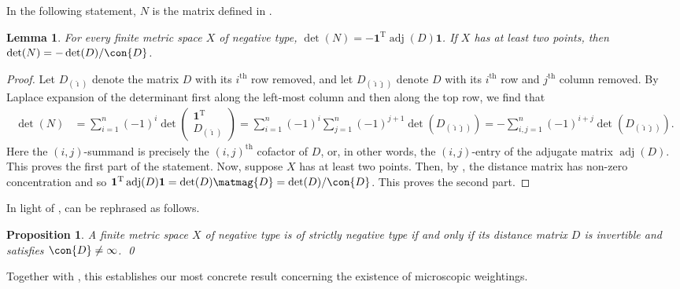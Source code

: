 \documentclass[a4paper, oneside, reqno]{amsart}
\newtheorem{lemma}[theorem]{Lemma}
\newtheorem{prop}[theorem]{Proposition}
\theoremstyle{definition}
\theoremstyle{remark}
\numberwithin{equation}{section}
\DeclareMathOperator{\adj}{adj}
\renewcommand{\th}{\text{th}}
\newcommand{\onevector}{\mathbf{1}}
\newcommand{\transpose}{\mathrm{T}}
\begin{document}
In the following statement, \(N\) is the matrix defined in .

\begin{lemma}
    \label{lem:det-N-adj-D}
    For every finite metric space \(X\) of negative type,
    \(
        \det(N) = - \onevector^\transpose \adj(D) \onevector
    \).
    If \(X\) has at least two points, then
    \(
    \det(N) = -\det(D) / \con{D}
    \).
\end{lemma}
 
\begin{proof}
    Let \(D_{(\hat\imath)}\) denote the matrix \(D\) with its \(i^\th\) row removed, and let \(D_{(\hat\imath\hat\jmath)}\) denote \(D\) with its \(i^\th\) row and \(j^\th\) column removed. By Laplace expansion of the determinant first along the left-most column and then along the top row, we find that
    \begin{align*}
        \det(N)
        &=
        \sum_{i=1}^n (-1)^i 
        \det
        \begin{pmatrix}
            \onevector^\transpose \\ D_{(\hat\imath)}
        \end{pmatrix}
        =
        \sum_{i=1}^n (-1)^i 
        \sum_{j=1}^n (-1)^{j+1} 
        \det(D_{(\hat\imath \hat\jmath)})
        =
        -\sum_{i,j=1}^n
        (-1)^{i+j} 
        \det(D_{(\hat\imath \hat\jmath)}).
    \end{align*}
    Here the  \((i,j)\)-summand is precisely the \((i,j)^\th\) cofactor of \(D\), or, in other words, the \((i,j)\)-entry of the adjugate matrix \(\adj(D)\). This proves the first part of the statement. Now, suppose \(X\) has at least two points. Then, by , the distance matrix has non-zero concentration and so
    \(\onevector^\transpose \adj(D) \onevector = \det(D)\matmag{D} = {\det(D)}/{\con{D}}\). This proves the second part.
\end{proof}

In light of ,  can be rephrased as follows.

\begin{prop}
\label{prop:strict-neg-type-iff-mag-det}
A finite metric space \(X\) of negative type is of strictly negative type if and only if its distance matrix \(D\) is invertible and satisfies \(\con{D} \neq \infty\). \qed
\end{prop}

Together with , this establishes our most concrete result concerning the existence of microscopic weightings.
\end{document}
